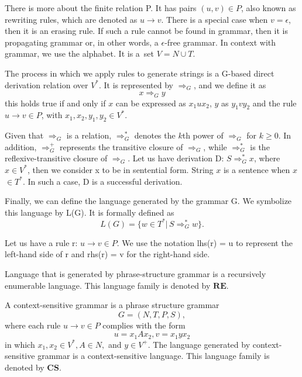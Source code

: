 There is more about the finite relation P. It has pairs $(u,v) \in P$, also known as rewriting rules, which are denoted as $u \rightarrow v$. There is a special case when $v = \epsilon$, then it is an erasing rule. If such a rule cannot be found in grammar, then it is propagating grammar or, in other words, a $\epsilon$\textnormal{-}free grammar. In context with grammar, we use the alphabet. It is a~set $V = N \cup T.$

The process in which we apply rules to generate strings is a G-based direct derivation relation over $V^*$. It is represented by $\Rightarrow_G$, and we define it as
$$ x \Rightarrow_G y$$ this holds true if and only if $x$ can be expressed as $x_1ux_2$, $y$ as $y_1vy_2$ and the rule $u \rightarrow v \in P$, with $x_1,x_2,y_1,y_2 \in V^*$.

Given that $\Rightarrow_G$ is a relation, $\Rightarrow^*_G$ denotes the $k$th power of $\Rightarrow_G$ for $k \geq 0$. In addition, $\Rightarrow^+_G$ represents the transitive closure of $\Rightarrow_G$, while $\Rightarrow^*_G$ is the reflexive-transitive closure of $\Rightarrow_G$. Let us have derivation D: $S \Rightarrow^*_G x$, where $x \in V^*$, then we consider x to be in sentential form. String $x$ is a sentence when $x$ $\in T^*$. In such a case, D is a successful derivation.

Finally, we can define the language generated by the grammar G. We symbolize this language by L(G). It is formally defined as
$$ L(G) = \{w \in T^*| \, S \Rightarrow^*_G w\}.$$

\begin{definition}
\label{Def14}
Let us have a rule r: $u \rightarrow v \in P$. We use the notation lhs(r) = u to represent the left-hand side of r and rhs(r) = v for the right-hand side. 
\end{definition}

\begin{definition}
\label{Def15}
Language that is generated by phrase-structure grammar is a recursively enumerable language. This language family is denoted by \(\mathbf{RE}\).
\end{definition}

\begin{definition}
\label{Def16}
A context-sensitive grammar is a phrase structure grammar $$ G = (N, T, P, S),$$ where each rule $u \rightarrow v \in P$ complies with the form
$$u = x_1Ax_2, v = x_1yx_2$$ in which $x_1,x_2 \in V^*, A \in N,$ and $y \in V^+$. The language generated by context-sensitive grammar is a context-sensitive language. This language family is denoted by \(\mathbf{CS}\).
\end{definition}

